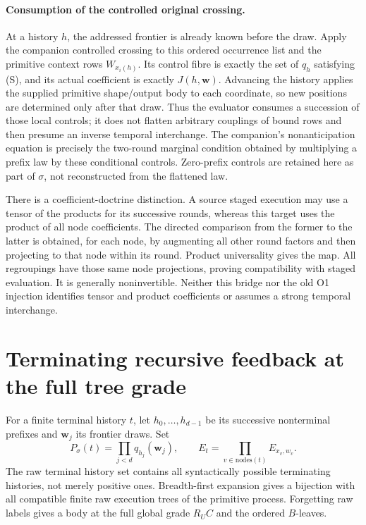 \documentclass[11pt]{article}
\begin{document}
\paragraph{Consumption of the controlled original crossing.}
At a history $h$, the addressed frontier is already known before the draw. Apply the companion controlled crossing to this ordered occurrence list and the primitive context rows $W_{x_i(h)}$. Its control fibre is exactly the set of $q_h$ satisfying (S), and its actual coefficient is exactly $J(h,\mathbf w)$. Advancing the history applies the supplied primitive shape/output body to each coordinate, so new positions are determined only after that draw. Thus the evaluator consumes a succession of those local controls; it does not flatten arbitrary couplings of bound rows and then presume an inverse temporal interchange. The companion's nonanticipation equation is precisely the two-round marginal condition obtained by multiplying a prefix law by these conditional controls. Zero-prefix controls are retained here as part of $\sigma$, not reconstructed from the flattened law.

There is a coefficient-doctrine distinction. A source staged execution may use a tensor of the products for its successive rounds, whereas this target uses the product of all node coefficients. The directed comparison from the former to the latter is obtained, for each node, by augmenting all other round factors and then projecting to that node within its round. Product universality gives the map. All regroupings have those same node projections, proving compatibility with staged evaluation. It is generally noninvertible. Neither this bridge nor the old O1 injection identifies tensor and product coefficients or assumes a strong temporal interchange.

\section{Terminating recursive feedback at the full tree grade}
For a finite terminal history $t$, let $h_0,\ldots,h_{d-1}$ be its successive nonterminal prefixes and $\mathbf w_j$ its frontier draws. Set
\[
 P_\sigma(t)=\prod_{j<d}q_{h_j}(\mathbf w_j),\qquad
 E_t=\prod_{v\in\mathrm{nodes}(t)}E_{x_v,w_v}.                 \tag{T}
\]
The raw terminal history set contains all syntactically possible terminating histories, not merely positive ones. Breadth-first expansion gives a bijection with all compatible finite raw execution trees of the primitive process. Forgetting raw labels gives a body at the full global grade $R_U C$ and the ordered $B$-leaves.
\end{document}
